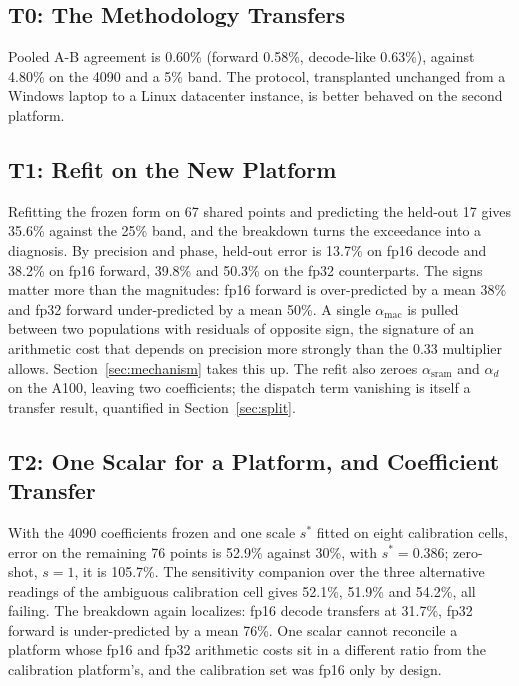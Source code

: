 \documentclass[conference]{IEEEtran}
\begin{document}
\subsection{T0: The Methodology Transfers}

Pooled A-B agreement is 0.60\% (forward 0.58\%, decode-like 0.63\%),
against 4.80\% on the 4090 and a 5\% band. The protocol, transplanted
unchanged from a Windows laptop to a Linux datacenter instance, is better
behaved on the second platform.

\subsection{T1: Refit on the New Platform}

Refitting the frozen form on 67 shared points and predicting the held-out 17
gives 35.6\% against the 25\% band, and the breakdown turns the exceedance
into a diagnosis. By precision and phase, held-out error is 13.7\% on fp16
decode and 38.2\% on fp16 forward, 39.8\% and 50.3\% on the fp32
counterparts. The signs matter more than the magnitudes: fp16 forward is
over-predicted by a mean 38\% and fp32 forward under-predicted by a mean
50\%. A single $\alpha_{\mathrm{mac}}$ is pulled between two populations
with residuals of opposite sign, the signature of an arithmetic cost that
depends on precision more strongly than the 0.33 multiplier allows.
Section~\ref{sec:mechanism} takes this up. The refit also zeroes
$\alpha_{\mathrm{sram}}$ and $\alpha_d$ on the A100, leaving two
coefficients; the dispatch term vanishing is itself a transfer result,
quantified in Section~\ref{sec:split}.

\subsection{T2: One Scalar for a Platform, and Coefficient Transfer}

With the 4090 coefficients frozen and one scale $s^\ast$ fitted on eight
calibration cells, error on the remaining 76 points is 52.9\% against 30\%,
with $s^\ast = 0.386$; zero-shot, $s = 1$, it is 105.7\%. The sensitivity
companion over the three alternative readings of the ambiguous calibration
cell gives 52.1\%, 51.9\% and 54.2\%, all failing. The breakdown again
localizes: fp16 decode transfers at 31.7\%, fp32 forward is under-predicted
by a mean 76\%. One scalar cannot reconcile a platform whose fp16 and fp32
arithmetic costs sit in a different ratio from the calibration platform's,
and the calibration set was fp16 only by design.
\end{document}
